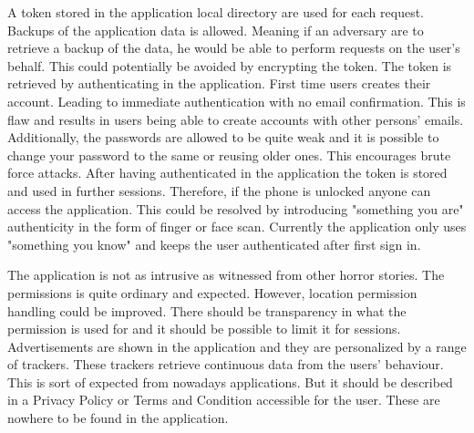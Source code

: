 A token stored in the application local directory are used for each request. Backups of the application data is allowed. Meaning if an adversary are to retrieve a backup of the data, he would be able to perform requests on the user's behalf. This could potentially be avoided by encrypting the token. The token is retrieved by authenticating in the application. First time users creates their account. Leading to immediate authentication with no email confirmation. This is flaw and results in users being able to create accounts with other persons' emails. Additionally, the passwords are allowed to be quite weak and it is possible to change your password to the same or reusing older ones. This encourages brute force attacks. After having authenticated in the application the token is stored and used in further sessions. Therefore, if the phone is unlocked anyone can access the application. This could be resolved by introducing "something you are" authenticity in the form of finger or face scan. Currently the application only uses "something you know" and keeps the user authenticated after first sign in.  

The application is not as intrusive as witnessed from other horror stories. The permissions is quite ordinary and expected. However, location permission handling could be improved. There should be transparency in what the permission is used for and it should be possible to limit it for sessions. Advertisements are shown in the application and they are personalized by a range of trackers. These trackers retrieve continuous data from the users' behaviour. This is sort of expected from nowadays applications. But it should be described in a Privacy Policy or Terms and Condition accessible for the user. These are nowhere to be found in the application.
